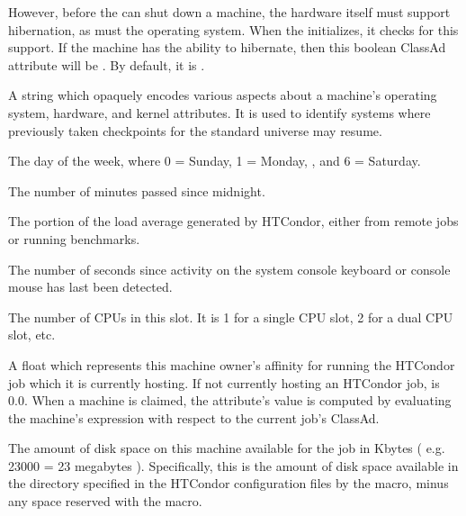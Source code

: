 \begin{description}
However, before the  can shut down a machine, 
the hardware itself must support hibernation, as must the operating system. 
When the  initializes, 
it checks for this support.
If the machine has the ability to hibernate, 
then this boolean ClassAd attribute will be .
By default, it is .
%
\label{CheckpointPlatform-machine-attribute}
\item[\AdAttr{CheckpointPlatform}:] A string which opaquely encodes various
aspects about a machine's operating system, hardware, and kernel
attributes.
It is used to identify systems where previously taken checkpoints for
the standard universe may resume.
%
\item[\AdAttr{ClockDay}:] The day of the week, 
where 0 = Sunday, 1 = Monday, \Dots, and 6 = Saturday. 
%
\item[\AdAttr{ClockMin}:] The number of minutes passed since midnight.
%
\item[\AdAttr{CondorLoadAvg}:] The portion of the load average generated 
by HTCondor, either from remote jobs or running benchmarks.
%
\item[\AdAttr{ConsoleIdle}:] The number of seconds since activity on the system
console keyboard or console mouse has last been detected.
%
\item[\AdAttr{Cpus}:]  The number of CPUs in this slot.
It is 1 for a single CPU slot, 2 for a dual CPU slot, etc.
%
\item[\AdAttr{CurrentRank}:] A float which represents this machine
owner's affinity
for running the HTCondor job which it is currently hosting.  If not
currently hosting an HTCondor job,  is 0.0.
When a machine is claimed,
the attribute's value is computed by evaluating the machine's
 expression with respect to the current job's ClassAd.
%
\item[\AdAttr{Disk}:] The amount of disk space on this machine available for
the job in Kbytes ( e.g. 23000 = 23 megabytes ).  Specifically, this
is the amount of disk space available in the directory specified in
the HTCondor configuration files by the  macro, minus any
space reserved with the  macro.

\end{description}
